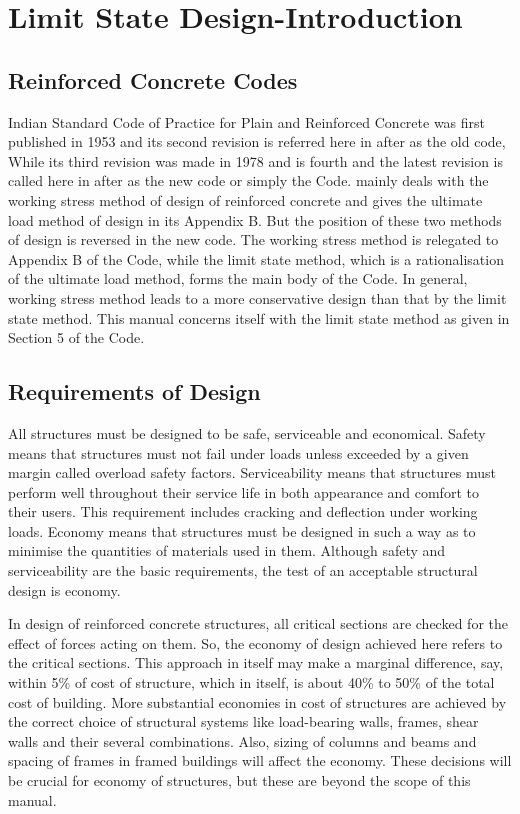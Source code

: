 \chapter{Limit State Design-Introduction}
\section{Reinforced Concrete Codes}

Indian Standard Code of Practice for Plain and Reinforced Concrete was 
first published in 1953 and its second revision 
is referred here in after as the old code, While its third revision
was made in 1978 and is fourth and the latest revision
 is called here in after as the new code or
simply the Code.  mainly deals with the
working stress method of design of reinforced concrete and gives the 
ultimate load method of design in its Appendix B. But the position of 
these two methods of design is reversed in the new code. The working 
stress method is relegated to Appendix B of the Code, while the limit
state method, which is a rationalisation of the ultimate load method, 
forms the main body of the Code. In general, working stress method leads
to a more conservative design than that by the limit state method. This 
manual concerns itself with the limit state method as given in Section
5 of the Code.

\section{Requirements of Design}

All structures must be designed to be safe, serviceable and economical.
Safety means that structures must not fail under loads unless exceeded 
by a given margin called overload safety factors. Serviceability means 
that structures must perform well throughout their service life in both
appearance and comfort to their users. This requirement includes cracking
and deﬂection under working loads. Economy means that structures must be 
designed in such a way as to minimise the quantities of materials used in
them. Although safety and serviceability are the basic requirements, the 
test of an acceptable structural design is economy.

In design of reinforced concrete structures, all critical sections are
checked for the effect of forces acting on them. So, the economy of
design achieved here refers to the critical sections. This approach in
itself may make a marginal difference, say, within 5\% of cost of
structure, which in itself, is about 40\% to 50\% of the total cost of
building. More substantial economies in cost of structures are achieved 
by the correct choice of structural systems like load-bearing walls,
frames, shear walls and their several combinations. Also, sizing of
columns and beams and spacing of frames in framed buildings will affect
the economy. These decisions will be crucial for economy of structures,
but these are beyond the scope of this manual.

